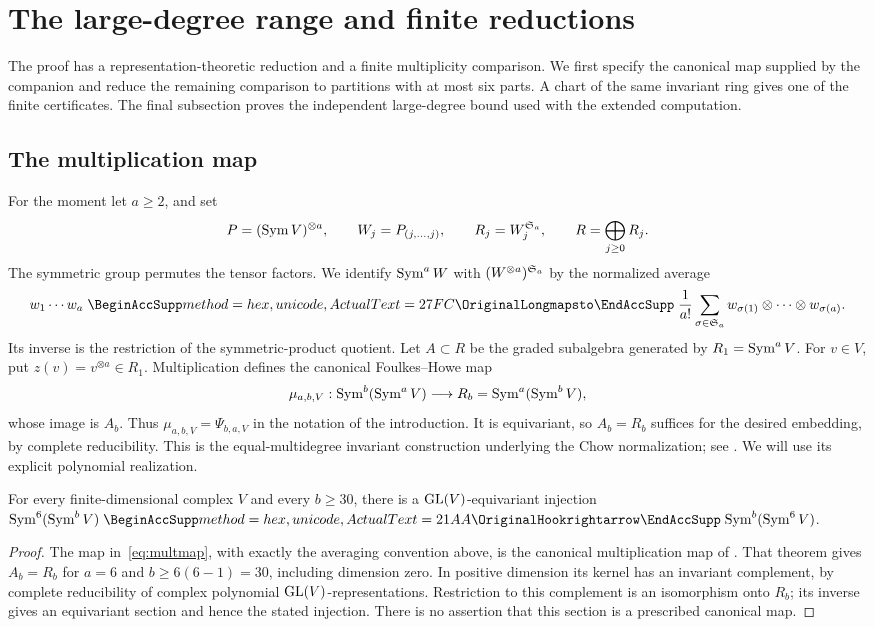 \section{The large-degree range and finite reductions}\label{sec:reduction}

The proof has a representation-theoretic reduction and a finite
multiplicity comparison. We first specify the canonical map supplied by
the companion and reduce the remaining comparison to partitions with at
most six parts. A chart of the same invariant ring gives one of the finite
certificates. The final subsection proves the independent large-degree
bound used with the extended computation.

\subsection{The multiplication map}
For the moment let \(a\ge2\), and set
\[
 P=(\operatorname{Sym} V)^{\otimes a},\qquad
 W_j=P_{(j,\ldots,j)},\qquad
 R_j=W_j^{\mathfrak S_a},\qquad R=\bigoplus_{j\ge0}R_j.
\]
The symmetric group permutes the tensor factors. We identify
\(\operatorname{Sym}^a W\) with \((W^{\otimes a})^{\mathfrak S_a}\) by the normalized average
\[
 w_1\cdots w_a\longmapsto
 \frac1{a!}\sum_{\sigma\in\SSS_a}
 w_{\sigma(1)}\otimes\cdots\otimes w_{\sigma(a)}.
\]
Its inverse is the restriction of the symmetric-product quotient.
Let \(A\subset R\)
be the graded subalgebra generated by \(R_1=\operatorname{Sym}^a V\).
For \(v\in V\), put \(z(v)=v^{\otimes a}\in R_1\).
Multiplication defines the canonical Foulkes--Howe map
\begin{equation}\label{eq:multmap}
       \mu_{a,b,V}:\operatorname{Sym}^b(\operatorname{Sym}^a V)\longrightarrow
       R_b=\operatorname{Sym}^a(\operatorname{Sym}^b V),
\end{equation}
whose image is \(A_b\). Thus \(\mu_{a,b,V}=\Psi_{b,a,V}\) in the
notation of the introduction. It is equivariant, so \(A_b=R_b\) suffices
for the desired embedding, by complete
reducibility. This is the equal-multidegree invariant construction
underlying the Chow normalization; see \cite[Section~2]{RaicuSamWeyman2022}.
We will use its explicit polynomial realization.

\begin{corollary}\label{cor:quadratic-range}
For every finite-dimensional complex \(V\) and every \(b\ge30\), there
is a \(\operatorname{GL}(V)\)-equivariant injection
\(\Sym^6(\Sym^b V)\hookrightarrow\Sym^b(\Sym^6 V)\).
\end{corollary}
\begin{proof}
The map in~\eqref{eq:multmap}, with exactly the averaging convention
above, is the canonical multiplication map of
\cite[Theorem~1]{OpenAIQuadratic2026}. That theorem gives \(A_b=R_b\)
for \(a=6\) and \(b\ge6(6-1)=30\), including dimension zero.
In positive dimension its kernel has an invariant complement, by
complete reducibility of complex polynomial \(\operatorname{GL}(V)\)-representations.
Restriction to this complement is an isomorphism onto \(R_b\);
its inverse gives an equivariant section and hence the stated injection.
There is no assertion that this section is a prescribed canonical map.
\end{proof}

